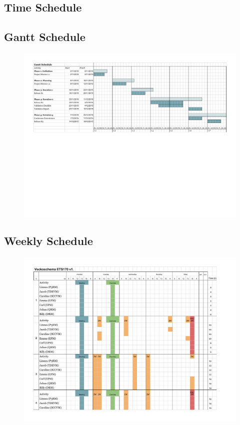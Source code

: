 \documentclass[10pt,a4paper]{article}
\begin{document}
\newpage
\begin{appendices}
\section{Time Schedule}

\subsection{Gantt Schedule}
\begin{figure}[h!]
\centering
\includegraphics[width=1.1\textwidth]{Gantt.pdf}
\end{figure}
\FloatBarrier

\subsection{Weekly Schedule}
\begin{figure}[h!]
\centering
\includegraphics[width=1.1\textwidth, trim=0mm 0mm 0mm 0mm, clip]{Veckoschema.pdf}
\end{figure}


\end{appendices}
\end{document}
